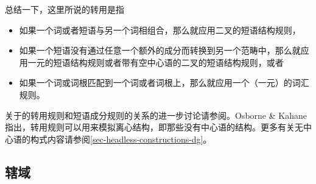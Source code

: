 总结一下，这里所说的转用是指
\begin{itemize}
\item 如果一个词或者短语与另一个词相组合，那么就应用二叉的短语结构规则，
\item 如果一个短语没有通过任意一个额外的成分而转换到另一个范畴中，那么就应用一元的短语结构规则或者带有空中心语的二叉的短语结构规则，或者
\item 如果一个词或词根匹配到一个词或者词根上，那么就应用一个（一元）的词汇规则。
\end{itemize}
关于\tes 的转用规则和短语成分规则的关系的进一步讨论请参阅。Osborne \& Kahane指出，转用规则可以用来模拟离心结构，即那些没有中心语的结构。更多有关无中心语的构式内容请参阅\ref{sec-headless-constructions-dg}。

\subsection{辖域}

